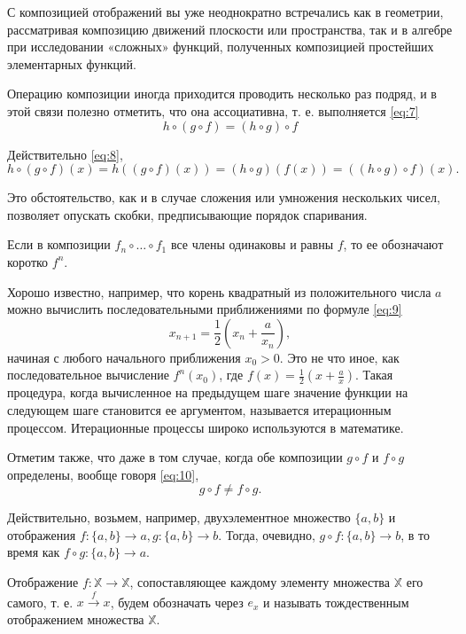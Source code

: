 С композицией отображений вы уже неоднократно встречались как в геометрии, рассматривая композицию движений плоскости или пространства,
так и в алгебре при исследовании «сложных» функций, полученных композицией простейших элементарных функций.

Операцию композиции иногда приходится проводить несколько раз подряд, и в этой связи полезно отметить, что она ассоциативна, т. е. выполняется \eqref{eq:7}
\begin{equation}
\label{eq:7}
h \circ (g \circ f)=(h \circ g) \circ f
\end{equation}

Действительно \eqref{eq:8},
\begin{equation}
\label{eq:8}
h \circ (g \circ f)(x)=h((g \circ f)(x))=(h \circ g)(f(x))=((h \circ g) \circ f)(x).
\end{equation}

Это обстоятельство, как и в случае сложения или умножения нескольких
чисел, позволяет опускать скобки, предписывающие порядок спаривания.

Если в композиции $f_n \circ \dots \circ f_1$ все члены одинаковы и равны $f$, то ее обозначают коротко $f^n$.

Хорошо известно, например, что корень квадратный из положительного
числа $a$ можно вычислить последовательными приближениями по формуле \eqref{eq:9}
\begin{equation}
\label{eq:9}
x_{n+1}=\frac{1}{2} (x_n + \frac{a}{x_n}),
\end{equation}
начиная с любого начального приближения $x_0>0$. Это не что иное, как последовательное вычисление $f^n(x_0)$, где $f(x)=\frac{1}{2}(x+\frac{a}{x})$. Такая процедура, когда вычисленное на предыдущем шаге значение функции на следующем
шаге становится ее аргументом, называется итерационным процессом. Итерационные процессы широко используются в математике.

Отметим также, что даже в том случае, когда обе композиции $g \circ f$ и $f \circ g$
определены, вообще говоря \eqref{eq:10},
\begin{equation}
\label{eq:10}
g \circ f \ne f \circ g.
\end{equation}

Действительно, возьмем, например, двухэлементное множество $\{a, b\}$ и
отображения $f \colon \{a, b\} \to a, g \colon \{a, b\} \to b$. Тогда, очевидно, $g \circ f \colon \{a, b\} \to b$, в то время как $f \circ g \colon \{a, b\} \to a$.

Отображение $f \colon \mathbb{X} \to \mathbb{X}$, сопоставляющее каждому элементу множества $\mathbb{X}$
его самого, т. е. $x \xrightarrow{f} x$, будем обозначать через $e_x$ и называть тождественным отображением множества $\mathbb{X}$.

